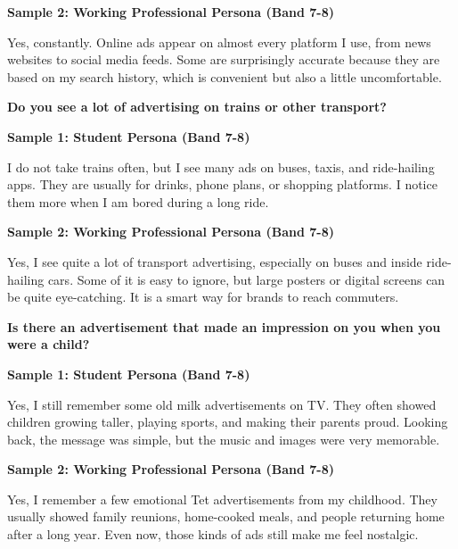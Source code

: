 \textbf{Sample 2: Working Professional Persona (Band 7-8)}

Yes, constantly. Online ads appear on almost every platform I use, from news websites to social media feeds. Some are surprisingly accurate because they are based on my search history, which is convenient but also a little uncomfortable.

\separator

\begin{ieltsquestion}
\textbf{Do you see a lot of advertising on trains or other transport?}
\end{ieltsquestion}
\textbf{Sample 1: Student Persona (Band 7-8)}

I do not take trains often, but I see many ads on buses, taxis, and ride-hailing apps. They are usually for drinks, phone plans, or shopping platforms. I notice them more when I am bored during a long ride.

\textbf{Sample 2: Working Professional Persona (Band 7-8)}

Yes, I see quite a lot of transport advertising, especially on buses and inside ride-hailing cars. Some of it is easy to ignore, but large posters or digital screens can be quite eye-catching. It is a smart way for brands to reach commuters.

\separator

\begin{ieltsquestion}
\textbf{Is there an advertisement that made an impression on you when you were a child?}
\end{ieltsquestion}
\textbf{Sample 1: Student Persona (Band 7-8)}

Yes, I still remember some old milk advertisements on TV. They often showed children growing taller, playing sports, and making their parents proud. Looking back, the message was simple, but the music and images were very memorable.

\textbf{Sample 2: Working Professional Persona (Band 7-8)}

Yes, I remember a few emotional Tet advertisements from my childhood. They usually showed family reunions, home-cooked meals, and people returning home after a long year. Even now, those kinds of ads still make me feel nostalgic.

\separator


